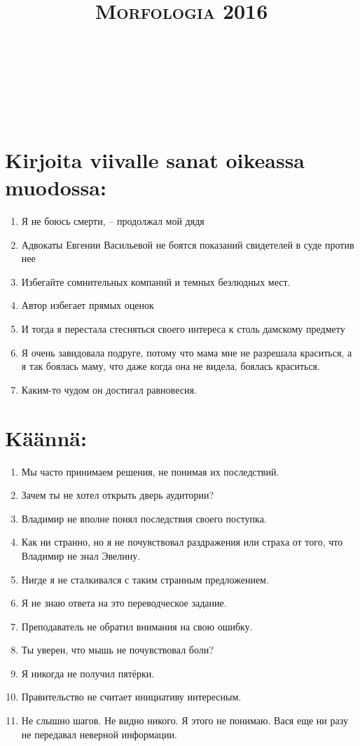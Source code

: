 \documentclass[paper=a4, fontsize=11pt]{scrartcl}
\title{	
\normalfont \normalsize 
\textsc{Morfologia 2016} \\ [25pt] 
\horrule{0.5pt} \\[0.4cm] 
\huge  \\ 
\horrule{2pt} \\[0.5cm] 
}
\date{}
\begin{document}
\onehalfspacing

\section{Kirjoita viivalle sanat oikeassa muodossa:}

\begin{enumerate}
    \item Я не боюсь смерти, -- продолжал мой дядя
    \item Адвокаты Евгении Васильевой не боятся показаний свидетелей в суде против нее
    \item Избегайте сомнительных компаний и темных безлюдных мест.
    \item Автор избегает прямых оценок
    \item И тогда я перестала стесняться своего интереса к столь дамскому предмету
    \item Я очень завидовала подруге, потому что мама мне не разрешала краситься, а я так боялась маму, что даже когда она не видела, боялась краситься.
    \item Каким-то чудом он достигал равновесия.
\end{enumerate}

\section{Käännä:}

\begin{enumerate}
    \item Мы часто принимаем решения, не понимая их последствий.
    \item Зачем ты не хотел открыть дверь аудитории? 
    \item Владимир не вполне понял последствия своего поступка. 
    \item Как ни странно, но я не почувствовал раздражения или страха от того, что Владимир не знал Эвелину.
    \item Нигде я не сталкивался с таким странным предложением. 
    \item Я не знаю ответа на это переводческое задание.
    \item Преподаватель не обратил внимания на свою ошибку.
    \item Ты уверен, что мышь не почувствовал боли? 
    \item Я никогда не получил пятёрки.
    \item Правительство не считает инициативу интересным.
    \item Не слышно шагов. Не видно никого. Я этого не понимаю. Вася еще ни разу не передавал неверной информации.
\end{enumerate}
\end{document}
